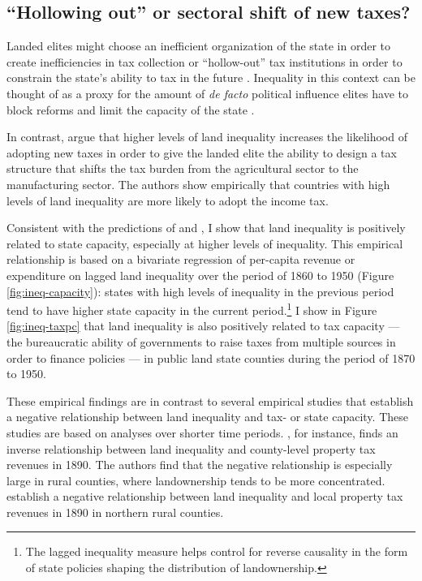 \subsection{``Hollowing out'' or sectoral shift of new taxes?}
	
Landed elites might choose an inefficient organization of the state in order to create inefficiencies in tax collection \citep{acemoglu2011emergence} or ``hollow-out'' tax institutions in order to constrain the state's ability to tax in the future \citep{suryanarayan2017hollowing}. Inequality in this context can be thought of as a proxy for the amount of \emph{de facto} political influence elites have to block reforms and limit the capacity of the state \citep{acemoglu2008persistence}.

In contrast, \citet{mares2015non} argue that higher levels of land inequality increases the likelihood of adopting new taxes in order to give the landed elite the ability to design a tax structure that shifts the tax burden from the agricultural sector to the manufacturing sector. The authors show empirically that countries with high levels of land inequality are more likely to adopt the income tax. 

Consistent with the predictions of \citet{mares2015non} and \citet{meltzer1981rational}, I show that land inequality is positively related to state capacity, especially at higher levels of inequality. This empirical relationship is based on a bivariate regression of per-capita revenue or expenditure on lagged land inequality over the period of 1860 to 1950 (Figure \ref{fig:ineq-capacity}): states with high levels of inequality in the previous period tend to have higher state capacity in the current period.\footnote{The lagged inequality measure helps control for reverse causality in the form of state policies shaping the distribution of landownership.} I show in Figure \ref{fig:ineq-taxpc} that land inequality is also positively related to tax capacity --- the bureaucratic ability of governments to raise taxes from multiple sources in order to finance policies --- in public land state counties during the period of 1870 to 1950.

These empirical findings are in contrast to several empirical studies that establish a negative relationship between land inequality and tax- or state capacity. These studies are based on analyses over shorter time periods. \citet{ramcharan2010inequality}, for instance, finds an inverse relationship between land inequality and county-level property tax revenues in 1890. The authors find that the negative relationship is especially large in rural counties, where landownership tends to be more concentrated. \citet{vollrath2013inequality} establish a negative relationship between land inequality and local property tax revenues in 1890 in northern rural counties. 

